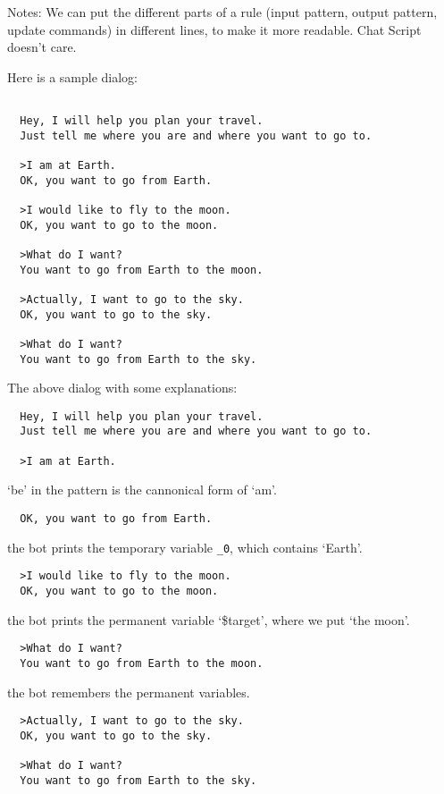\documentclass[]{article}
\begin{document}
Notes: We can put the different parts of a rule (input pattern, output
pattern, update commands) in different lines, to make it more readable.
Chat Script doesn't care.

Here is a sample dialog:

\begin{verbatim}

  Hey, I will help you plan your travel. 
  Just tell me where you are and where you want to go to.

  >I am at Earth. 
  OK, you want to go from Earth.

  >I would like to fly to the moon.
  OK, you want to go to the moon.

  >What do I want? 
  You want to go from Earth to the moon. 

  >Actually, I want to go to the sky.
  OK, you want to go to the sky.

  >What do I want?
  You want to go from Earth to the sky. 
\end{verbatim}

The above dialog with some explanations:

\begin{verbatim}
  Hey, I will help you plan your travel. 
  Just tell me where you are and where you want to go to.

  >I am at Earth. 
\end{verbatim}

`be' in the pattern is the cannonical form of `am'.

\begin{verbatim}
  OK, you want to go from Earth.
\end{verbatim}

the bot prints the temporary variable \texttt{\_0}, which contains
`Earth'.

\begin{verbatim}
  >I would like to fly to the moon.
  OK, you want to go to the moon.
\end{verbatim}

the bot prints the permanent variable `\$target', where we put `the
moon'.

\begin{verbatim}
  >What do I want? 
  You want to go from Earth to the moon. 
\end{verbatim}

the bot remembers the permanent variables.

\begin{verbatim}
  >Actually, I want to go to the sky.
  OK, you want to go to the sky.

  >What do I want?
  You want to go from Earth to the sky. 
\end{verbatim}
\end{document}
